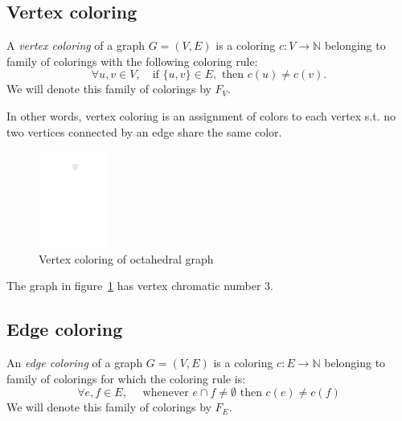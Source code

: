 \subsection{Vertex coloring}

\begin{definition}
    A \textit{vertex coloring} of a graph $G=(V,E)$ is a coloring $c : V \rightarrow \mathbb{N}$ belonging to family of colorings with the following coloring rule:
    \begin{equation}\label{eqn:vtx_rule}
        \forall u,v \in V, \quad \text{if } \{u,v\} \in E, \text{ then } c(u) \neq c(v). 
        \tag{$R_V$}
    \end{equation}
    We will denote this family of colorings by $F_V$.
\end{definition}

In other words, vertex coloring is an assignment of colors to each vertex s.t. no two vertices connected by an edge share the same color.

\begin{figure}[H]
    \centering
    \includegraphics[width=0.2\textwidth]{../Resources/Figs/octahedral_vtx_colr.pdf}
    \caption{Vertex coloring of octahedral graph}
    \label{fig:octahedral_vtx_coloring}
\end{figure}

The graph in figure~\ref{fig:octahedral_vtx_coloring} has vertex chromatic number 3.

\subsection{Edge coloring}

\begin{definition}
    An \textit{edge coloring} of a graph $G=(V,E)$ is a coloring $c: E \rightarrow \mathbb{N}$ belonging to family of colorings for which the coloring rule is: 
    \begin{equation}\label{eqn:edge_rule}
     \forall e,f \in E, \quad \text{ whenever } e \cap f \neq \emptyset \text{ then } c(e) \neq c(f) \tag{$R_E$}
    \end{equation}
    We will denote this family of colorings by $F_E$.
   
\end{definition}

